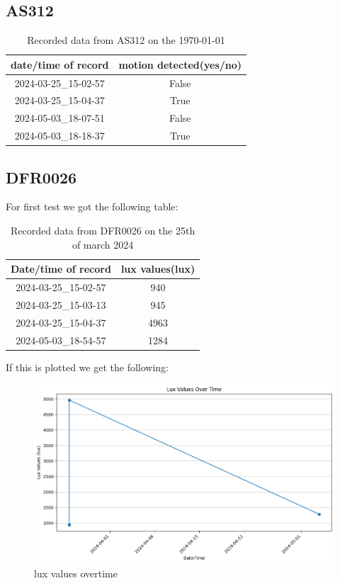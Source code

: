 \subsection{AS312}
\begin{table}[h!]
    \centering
    \begin{tabular}{|c|c|}
        \hline
        date/time of record & motion detected(yes/no)\\
        \hline \hline
        2024-03-25\_15-02-57&False \\
        2024-03-25\_15-04-37&True\\
        2024-05-03\_18-07-51&False\\
        2024-05-03\_18-18-37&True\\
        \hline
    \end{tabular}
    \caption{Recorded data from  AS312 on the \today}
    \label{Recorded data from  AS312 on the \today}
\end{table}
\subsection{DFR0026}
For first test we got  the following table: 
\begin{table}[h!]
    \centering
    \begin{tabular}{|c|c|}
        \hline
        Date/time of record & lux values(lux)\\
        \hline \hline
        2024-03-25\_15-02-57&940\\
        2024-03-25\_15-03-13&945\\
        2024-03-25\_15-04-37&4963\\
        2024-05-03\_18-54-57&1284\\
        \hline
    \end{tabular}
    \caption{Recorded data from DFR0026 on the 25th of march 2024}
    \label{Recorded data from DFR0026 on the 25th of march 2024}
\end{table}
If this is plotted we get the following:
\begin{figure}[h!]
    \centering
    \includegraphics[width=0.5\linewidth]{Images/lux_values_overtime.png}
    \caption{lux values overtime}
    \label{lux values overtime}
\end{figure}
\newpage
